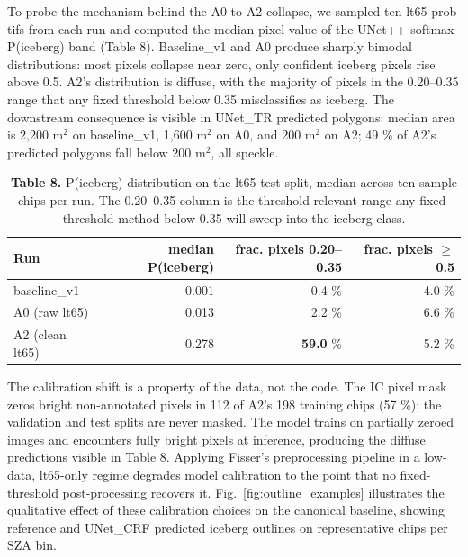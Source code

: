 \documentclass[review,jog]{igs}
\begin{document}
To probe the mechanism behind the A0 to A2 collapse, we sampled ten lt65 prob-tifs from each run and computed the median pixel value of the UNet++ softmax P(iceberg) band (Table 8). Baseline\_v1 and A0 produce sharply bimodal distributions: most pixels collapse near zero, only confident iceberg pixels rise above 0.5. A2's distribution is diffuse, with the majority of pixels in the 0.20--0.35 range that any fixed threshold below 0.35 misclassifies as iceberg. The downstream consequence is visible in UNet\_TR predicted polygons: median area is 2,200 m$^2$ on baseline\_v1, 1,600 m$^2$ on A0, and 200 m$^2$ on A2; 49 \% of A2's predicted polygons fall below 200 m$^2$, all speckle.

\begin{table}[h]
\caption{\textbf{Table 8.} P(iceberg) distribution on the lt65 test split, median across ten sample chips per run. The 0.20--0.35 column is the threshold-relevant range any fixed-threshold method below 0.35 will sweep into the iceberg class.}
\centering
\begin{tabular}{lrrr}
\toprule
Run & median P(iceberg) & frac. pixels 0.20--0.35 & frac. pixels $\geq$ 0.5 \\
\midrule
baseline\_v1   & 0.001 & 0.4 \%  & 4.0 \% \\
A0 (raw lt65)  & 0.013 & 2.2 \%  & 6.6 \% \\
A2 (clean lt65) & 0.278 & \textbf{59.0} \% & 5.2 \% \\
\bottomrule
\end{tabular}
\end{table}

The calibration shift is a property of the data, not the code. The IC pixel mask zeros bright non-annotated pixels in 112 of A2's 198 training chips (57 \%); the validation and test splits are never masked. The model trains on partially zeroed images and encounters fully bright pixels at inference, producing the diffuse predictions visible in Table 8. Applying Fisser's preprocessing pipeline in a low-data, lt65-only regime degrades model calibration to the point that no fixed-threshold post-processing recovers it. Fig.~\ref{fig:outline_examples} illustrates the qualitative effect of these calibration choices on the canonical baseline, showing reference and UNet\_CRF predicted iceberg outlines on representative chips per SZA bin.
\end{document}
